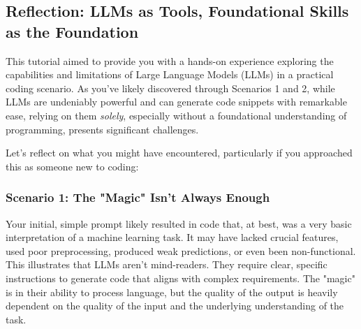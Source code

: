 \newpage
\subsection{Reflection: LLMs as Tools, Foundational Skills as the Foundation}

This tutorial aimed to provide you with a hands-on experience exploring the capabilities and limitations of Large Language Models (LLMs) in a practical coding scenario.  As you've likely discovered through Scenarios 1 and 2, while LLMs are undeniably powerful and can generate code snippets with remarkable ease,  relying on them \textit{solely}, especially without a foundational understanding of programming, presents significant challenges.

Let's reflect on what you might have encountered, particularly if you approached this as someone new to coding:

\subsubsection{Scenario 1: The "Magic" Isn't Always Enough}
Your initial, simple prompt likely resulted in code that, at best, was a very basic interpretation of a machine learning task.  It may have lacked crucial features, used poor preprocessing, produced weak predictions, or even been non-functional. This illustrates that LLMs aren't mind-readers.  They require clear, specific instructions to generate code that aligns with complex requirements.  The "magic" is in their ability to process language, but the quality of the output is heavily dependent on the quality of the input and the underlying understanding of the task.


